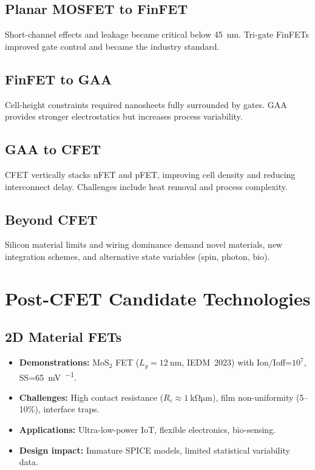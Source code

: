 \documentclass[conference]{IEEEtran}
\begin{document}
\subsection{Planar MOSFET to FinFET}
Short-channel effects and leakage became critical below \SI{45}{\nano\meter}. Tri-gate FinFETs improved gate control and became the industry standard.

\subsection{FinFET to GAA}
Cell-height constraints required nanosheets fully surrounded by gates. GAA provides stronger electrostatics but increases process variability.

\subsection{GAA to CFET}
CFET vertically stacks nFET and pFET, improving cell density and reducing interconnect delay. Challenges include heat removal and process complexity.

\subsection{Beyond CFET}
Silicon material limits and wiring dominance demand novel materials, new integration schemes, and alternative state variables (spin, photon, bio).

\section{Post-CFET Candidate Technologies}

\subsection{2D Material FETs}
\begin{itemize}
  \item \textbf{Demonstrations:} MoS$_2$ FET ($L_g=\SI{12}{\nano\meter}$, IEDM~2023) with Ion/Ioff=$10^7$, SS=\SI{65}{\milli\volt\per\decade}.
  \item \textbf{Challenges:} High contact resistance ($R_c \approx \SI{1}{\kilo\ohm\micro\meter}$), film non-uniformity (5--10\%), interface traps.
  \item \textbf{Applications:} Ultra-low-power IoT, flexible electronics, bio-sensing.
  \item \textbf{Design impact:} Immature SPICE models, limited statistical variability data.
\end{itemize}
\end{document}
